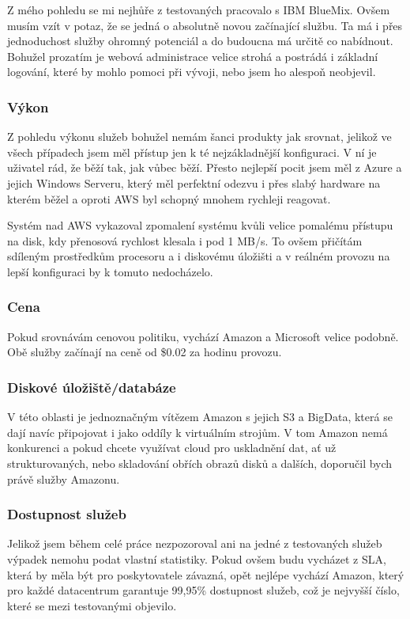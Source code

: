 Z mého pohledu se mi nejhůře z testovaných pracovalo s IBM BlueMix. Ovšem musím vzít v potaz, že se jedná o absolutně novou začínající službu. Ta má i přes jednoduchost služby ohromný potenciál a do budoucna má určitě co nabídnout. Bohužel prozatím je webová administrace velice strohá a postrádá i základní logování, které by mohlo pomoci při vývoji, nebo jsem ho alespoň neobjevil.

\subsubsection{Výkon}
Z pohledu výkonu služeb bohužel nemám šanci produkty jak srovnat, jelikož ve všech případech jsem měl přístup jen k té nejzákladnější konfiguraci. V ní je uživatel rád, že běží tak, jak vůbec běží. Přesto nejlepší pocit jsem měl z Azure a jejich Windows Serveru, který měl perfektní odezvu i přes slabý hardware na kterém běžel a oproti AWS byl schopný mnohem rychleji reagovat.

Systém nad AWS vykazoval zpomalení systému kvůli velice pomalému přístupu na disk, kdy přenosová rychlost klesala i pod 1 MB/s. To ovšem přičítám sdíleným prostředkům procesoru a i diskovému úložišti a v reálném provozu na lepší konfiguraci by k tomuto nedocházelo.

\subsubsection{Cena}
Pokud srovnávám cenovou politiku, vychází Amazon a Microsoft velice podobně. Obě služby začínají na ceně od \$0.02 za hodinu provozu.

\subsubsection{Diskové úložiště/databáze}
V této oblasti je jednoznačným vítězem Amazon s jejich S3 a BigData, která se dají navíc připojovat i jako oddíly k virtuálním strojům. V tom Amazon nemá konkurenci a pokud chcete využívat cloud pro uskladnění dat, ať už strukturovaných, nebo skladování obřích obrazů disků a dalších, doporučil bych právě služby Amazonu.

\subsubsection{Dostupnost služeb}
Jelikož jsem během celé práce nezpozoroval ani na jedné z testovaných služeb výpadek nemohu podat vlastní statistiky. Pokud ovšem budu vycházet z SLA, která by měla být pro poskytovatele závazná, opět nejlépe vychází Amazon, který pro každé datacentrum garantuje 99,95\% dostupnost služeb, což je nejvyšší číslo, které se mezi testovanými objevilo.

